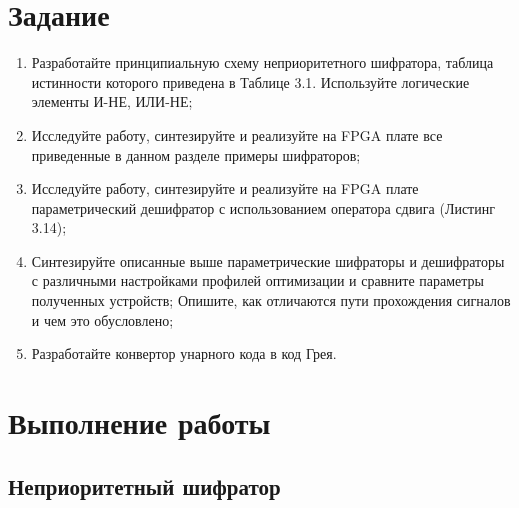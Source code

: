 \documentclass[a4paper,14pt]{article}
\begin{document}

\tableofcontents
\pagebreak
\section{Задание}

\begin{enumerate}
	\item Разработайте принципиальную схему неприоритетного шифратора, таблица истинности
	которого приведена в Таблице 3.1. Используйте логические элементы И-НЕ, ИЛИ-НЕ;
	
	\item Исследуйте работу, синтезируйте и реализуйте на FPGA плате все приведенные в данном
	разделе примеры шифраторов;
	
	\item Исследуйте работу, синтезируйте и реализуйте на FPGA плате параметрический дешифратор
	с использованием оператора сдвига (Листинг 3.14);
	
	\item Синтезируйте описанные выше параметрические шифраторы и дешифраторы с различными
	настройками профилей оптимизации и сравните параметры полученных устройств;
	Опишите, как отличаются пути прохождения сигналов и чем это обусловлено;
	
	\item Разработайте конвертор унарного кода в код Грея.
\end{enumerate}

\section{Выполнение работы}

\subsection{Неприоритетный шифратор}
 
\end{document}
